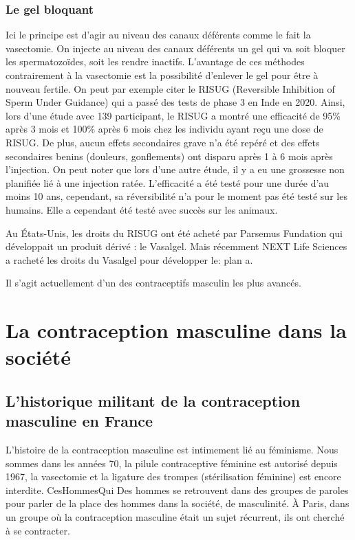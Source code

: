 \documentclass[12pt,a4paper]{report}
\begin{document}
\subsection{Le gel bloquant}

Ici le principe est d'agir au niveau des canaux déférents comme le fait la vasectomie. On injecte au niveau des canaux déférents un gel qui va soit bloquer les spermatozoïdes, soit les rendre inactifs.
L'avantage de ces méthodes contrairement à la vasectomie est la possibilité d'enlever le gel pour être à nouveau fertile.
On peut par exemple citer le RISUG (Reversible Inhibition of Sperm Under Guidance) qui a passé des tests de phase 3 en Inde en 2020. \cite{ContraceptionMasculineScience}
Ainsi, lors d'une étude avec 139 participant, le RISUG a montré une efficacité de 95\% après 3 mois et 100\% après 6 mois chez les individu ayant reçu une dose de RISUG. De plus, aucun effets secondaires grave n'a été repéré et des effets secondaires benins (douleurs, gonflements) ont disparu après 1 à 6 mois après l'injection. \cite{sharmaSafetyEfficacyIntravasal2019}
On peut noter que lors d'une autre étude, il y a eu une grossesse non planifiée lié à une injection ratée. \cite{RisugWikipedia}
L'efficacité a été testé pour une durée d'au moins 10 ans, cependant, sa réversibilité n'a pour le moment pas été testé sur les humains. Elle a cependant été testé avec succès sur les animaux. \cite{khilwaniRISUGMaleContraceptive2020}

Au États-Unis, les droits du RISUG ont été acheté par Parsemus Fundation qui développait un produit dérivé : le Vasalgel. Mais récemment NEXT Life Sciences a racheté les droits du Vasalgel pour développer le: plan a. \cite{ReversibleInhibitionSperm}\cite{VasalgelMaleContraceptive}\cite{PlanReversibleMale}

Il s'agit actuellement d'un des contraceptifs masculin les plus avancés. \cite{ContraceptionMasculineScience}

\chapter{La contraception masculine dans la société}

\section{L'historique militant de la contraception masculine en France} \label{section:militant}

L'histoire de la contraception masculine est intimement lié au féminisme.
Nous sommes dans les années 70, la pilule contraceptive féminine est autorisé depuis 1967, la vasectomie et la ligature des trompes (stérilisation féminine) est encore interdite. \cite{guillaumedaudinContraceptesEnqueteDernier2022}{CesHommesQui}
Des hommes se retrouvent dans des groupes de paroles pour parler de la place des hommes dans la société, de masculinité.
À Paris, dans un groupe où la contraception masculine était un sujet récurrent, ils ont cherché à se contracter.
\end{document}
